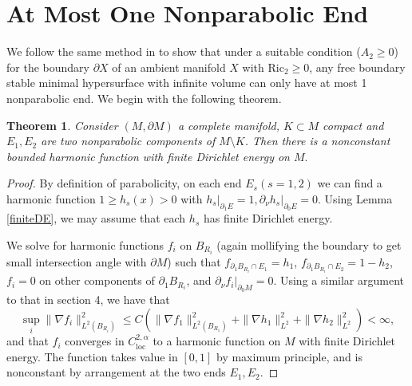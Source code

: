 \documentclass[12pt]{amsart}
\newcommand{\Ric}{\text{Ric}}
\newcommand{\loc}{\text{loc}}
\newcommand{\p}{\partial}
\newtheorem{theorem}{Theorem}[section]
\numberwithin{equation}{section}
\begin{document}
	\section{At Most One Nonparabolic End}\label{1NonparaEnd}

	We follow the same method in \cite{ChodoLiStryk2022-CompleteStableMinimal} to show that under a suitable condition ($A_2 \geq 0$) for the boundary $\p X$ of an ambient manifold $X$ with $\Ric_2 \geq 0$, any  free boundary stable minimal hypersurface with infinite volume can only have at most 1 nonparabolic end. We begin with the following theorem.


	\begin{theorem}\label{HarFinEne}
		Consider $(M,\partial M)$ a complete manifold, $K \subset M$ compact and $E_1, E_2$ are two nonparabolic components of $M\setminus K$. Then there is a  nonconstant bounded harmonic function with finite Dirichlet energy on $M.$
	\end{theorem}
	

	\begin{proof}
		By definition of parabolicity, on each end $E_s(s=1,2)$ we can find a harmonic function $1\geq h_s(x)>0$ with $h_s|_{\partial_1 E} =1, \partial_{\nu} h_s \vert_{\partial_0 E}=0$. Using Lemma \ref{finiteDE}, we may assume that each $h_s$ has finite Dirichlet energy.
		
		We solve for harmonic functions $f_i$ on $B_{R_i}$ (again mollifying the boundary to get small intersection angle with $\partial M$) such that $f_{\partial_1 B_{R_i} \cap E_1}=h_1$, $f_{\partial_1 B_{R_i} \cap E_2}=1-h_2$, $f_i=0$ on other components of $\partial_1 B_{R_i}$, and $\partial_{\nu}f_i \vert_{\partial_0 M} =0$. Using a similar argument to that in section 4, we have that $$\sup_i\|\nabla f_i\|^2_{L^2(B_{R_i})}\leq C(\|\nabla f_1\|^2_{L^2(B_{R_1})}+\|\nabla h_1\|^2_{L^2}+\|\nabla h_2\|^2_{L^2})<\infty,$$ and that $f_i$ converges in $C^{2,\alpha}_{\loc}$ to a harmonic function on $M$ with finite Dirichlet energy. The function takes value in $[0,1]$ by maximum principle, and is nonconstant by arrangement at the two ends $E_1, E_2$. 
	\end{proof}
\end{document}
